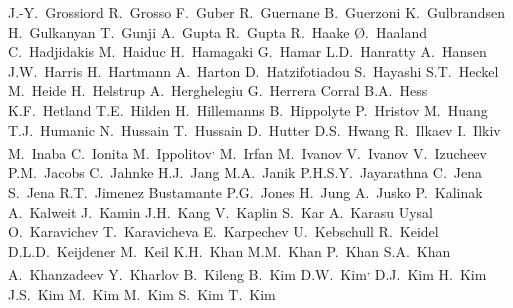 \begin{flushleft}
J.-Y.~Grossiord\And
R.~Grosso\And
F.~Guber\And
R.~Guernane\And
B.~Guerzoni\And
K.~Gulbrandsen\And
H.~Gulkanyan\And
T.~Gunji\And
A.~Gupta\And
R.~Gupta\And
R.~Haake\And
{\O}.~Haaland\And
C.~Hadjidakis\And
M.~Haiduc\And
H.~Hamagaki\And
G.~Hamar\And
L.D.~Hanratty\And
A.~Hansen\And
J.W.~Harris\And
H.~Hartmann\And
A.~Harton\And
D.~Hatzifotiadou\And
S.~Hayashi\And
S.T.~Heckel\And
M.~Heide\And
H.~Helstrup\And
A.~Herghelegiu\And
G.~Herrera Corral\And
B.A.~Hess\And
K.F.~Hetland\And
T.E.~Hilden\And
H.~Hillemanns\And
B.~Hippolyte\And
P.~Hristov\And
M.~Huang\And
T.J.~Humanic\And
N.~Hussain\And
T.~Hussain\And
D.~Hutter\And
D.S.~Hwang\And
R.~Ilkaev\And
I.~Ilkiv\And
M.~Inaba\And
C.~Ionita\And
M.~Ippolitov\textsuperscript{,}\And
M.~Irfan\And
M.~Ivanov\And
V.~Ivanov\And
V.~Izucheev\And
P.M.~Jacobs\And
C.~Jahnke\And
H.J.~Jang\And
M.A.~Janik\And
P.H.S.Y.~Jayarathna\And
C.~Jena\And
S.~Jena\And
R.T.~Jimenez Bustamante\And
P.G.~Jones\And
H.~Jung\And
A.~Jusko\And
P.~Kalinak\And
A.~Kalweit\And
J.~Kamin\And
J.H.~Kang\And
V.~Kaplin\And
S.~Kar\And
A.~Karasu Uysal\And
O.~Karavichev\And
T.~Karavicheva\And
E.~Karpechev\And
U.~Kebschull\And
R.~Keidel\And
D.L.D.~Keijdener\And
M.~Keil\And
K.H.~Khan\And
M.M.~Khan\And
P.~Khan\And
S.A.~Khan\And
A.~Khanzadeev\And
Y.~Kharlov\And
B.~Kileng\And
B.~Kim\And
D.W.~Kim\textsuperscript{,}\And
D.J.~Kim\And
H.~Kim\And
J.S.~Kim\And
M.~Kim\And
M.~Kim\And
S.~Kim\And
T.~Kim\And

\end{flushleft}
